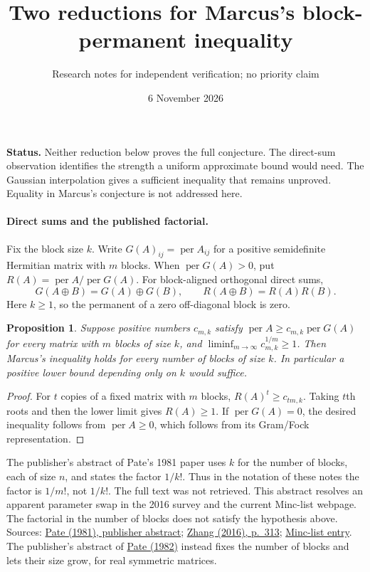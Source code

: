 \documentclass[11pt]{article}
\title{Two reductions for Marcus's block-permanent inequality}
\author{Research notes for independent verification; no priority claim}
\date{6 November 2026}
\newtheorem{proposition}{Proposition}
\newcommand{\per}{\operatorname{per}}
\begin{document}
\maketitle
\noindent\textbf{Status.} Neither reduction below proves the full conjecture.
The direct-sum observation identifies the strength a uniform approximate
bound would need. The Gaussian interpolation gives a sufficient inequality
that remains unproved. Equality in Marcus's conjecture is not addressed here.

\paragraph{Direct sums and the published factorial.}
Fix the block size $k$. Write $G(A)_{ij}=\per A_{ij}$ for a positive
semidefinite Hermitian matrix with $m$ blocks. When $\per G(A)>0$, put
$R(A)=\per A/\per G(A)$. For block-aligned orthogonal direct sums,
\[
 G(A\oplus B)=G(A)\oplus G(B),\qquad R(A\oplus B)=R(A)R(B).
\]
Here $k\ge1$, so the permanent of a zero off-diagonal block is zero.

\begin{proposition}
Suppose positive numbers $c_{m,k}$ satisfy
$\per A\ge c_{m,k}\per G(A)$ for every matrix with $m$ blocks of size $k$,
and $\liminf_{m\to\infty}c_{m,k}^{1/m}\ge1$.
Then Marcus's inequality holds for every number of blocks of size $k$.
In particular a positive lower bound depending only on $k$ would suffice.
\end{proposition}
\begin{proof}
For $t$ copies of a fixed matrix with $m$ blocks,
$R(A)^t\ge c_{tm,k}$. Taking $t$th roots and then the lower limit gives
$R(A)\ge1$. If $\per G(A)=0$, the desired inequality follows from
$\per A\ge0$, which follows from its Gram/Fock representation.
\end{proof}

The publisher's abstract of Pate's 1981 paper uses $k$ for the number of
blocks, each of size $n$, and states the factor $1/k!$. Thus in the notation
of these notes the factor is $1/m!$, not $1/k!$. The full text was not
retrieved. This abstract resolves an apparent parameter swap in the 2016
survey and the current Minc-list webpage. The factorial in the number of
blocks does not satisfy the hypothesis above.
Sources: \href{https://doi.org/10.1080/03081088108817400}{Pate (1981), publisher abstract};
\href{https://doi.org/10.1515/spma-2016-0030}{Zhang (2016), p.~313};
\href{https://yair-lavi.com/mincs-list/conjecture-9/index.html}{Minc-list entry}.
The publisher's abstract of
\href{https://doi.org/10.1080/03081088208817427}{Pate (1982)} instead fixes
the number of blocks and lets their size grow, for real symmetric matrices.
\end{document}
